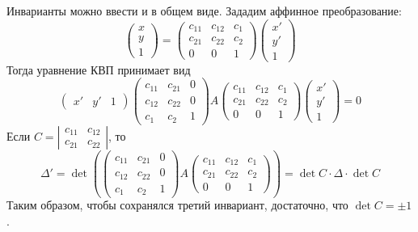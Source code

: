 \begin{Rem}
	Инварианты можно ввести и в общем виде.
	Зададим аффинное преобразование:
	\[\left(\begin{array}{c}
	x \\ 
	y \\ 
	1
	\end{array}\right) = \left(\begin{array}{ccc}
	c_{11} & c_{12} & c_1 \\ 
	c_{21} & c_{22} & c_2 \\ 
	0 & 0 & 1
	\end{array}\right) \left(\begin{array}{c}
	x' \\ 
	y' \\ 
	1
	\end{array}\right)\]
	Тогда уравнение КВП принимает вид
	\[\left(\begin{array}{ccc}
	x' & y' & 1
	\end{array}\right) \left(\begin{array}{ccc}
	c_{11} & c_{21} & 0 \\ 
	c_{12} & c_{22} & 0 \\ 
	c_1 & c_2 & 1
	\end{array}\right) A \left(\begin{array}{ccc}
	c_{11} & c_{12} & c_1 \\ 
	c_{21} & c_{22} & c_2 \\ 
	0 & 0 & 1
	\end{array}\right) \left(\begin{array}{c}
	x' \\ 
	y' \\ 
	1
	\end{array}\right) = 0\]
	Если $C = \left|\begin{array}{cc}
	c_{11} & c_{12} \\ 
	c_{21} & c_{22}
	\end{array}\right|$, то
	\[\Delta' = \det \left(\left(\begin{array}{ccc}
	c_{11} & c_{21} & 0 \\ 
	c_{12} & c_{22} & 0 \\ 
	c_1 & c_2 & 1
	\end{array}\right) A \left(\begin{array}{ccc}
	c_{11} & c_{12} & c_1 \\ 
	c_{21} & c_{22} & c_2 \\ 
	0 & 0 & 1
	\end{array}\right)\right) = \det C \cdot \Delta \cdot \det C\]
	Таким образом, чтобы сохранялся третий инвариант, достаточно, что $\det C = \pm 1$.
	

\end{Rem}
